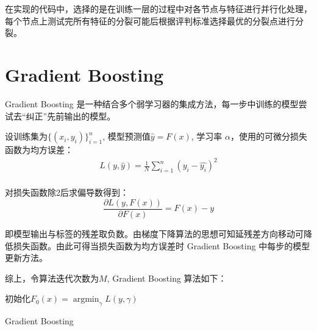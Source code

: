 \documentclass[12pt]{article}
\begin{document}
在实现的代码中，选择的是在训练一层的过程中对各节点与特征进行并行化处理，每个节点上测试完所有特征的分裂可能后根据评判标准选择最优的分裂点进行分裂。

\section{Gradient Boosting}

Gradient Boosting 是一种结合多个弱学习器的集成方法，每一步中训练的模型尝试去“纠正”先前输出的模型。

设训练集为$\{(x_i, y_i)\}_{i=1}^n$, 模型预测值$\hat{y}=F(x)$, 学习率 $\alpha$，使用的可微分损失函数为均方误差：
\begin{equation}
    \begin{aligned}
    L(y, \hat{y}) = \frac{1}{N}\sum_{i=1}^{n}(y_i - \hat{y_i})^2\\
    \end{aligned}
\end{equation}

对损失函数除2后求偏导数得到：
\begin{equation}
    \frac{\partial L(y, F(x))}{\partial F(x)}=F(x)-y
\end{equation}

即模型输出与标签的残差取负数。由梯度下降算法的思想可知延残差方向移动可降低损失函数。由此可得当损失函数为均方误差时 Gradient Boosting 中每步的模型更新方法。

综上，令算法迭代次数为$M$, Gradient Boosting 算法如下：

\begin{algorithm}[H]
    \SetAlgoLined
    初始化$F_0(x)=\mathop{\arg\min}_{\gamma} L(y, \gamma)$\;
    

    \caption{Gradient Boosting}
\end{algorithm}
\end{document}
